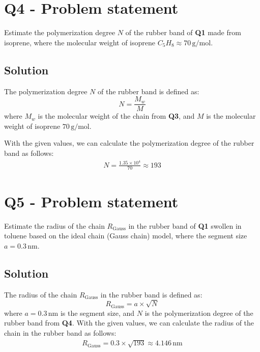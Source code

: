 \documentclass{article}
\begin{document}
\section*{Q4 - Problem statement}
Estimate the polymerization degree $N$ of the rubber band of \textbf{Q1} made from isoprene, where the molecular
weight of isoprene $C_5H_8 \approx 70 \, \mathrm{g/mol}$.
\subsection*{Solution}
The polymerization degree $N$ of the rubber band is defined as:
\begin{equation}
  N = \frac{M_w}{M}
\end{equation}
where $M_w$ is the molecular weight of the chain from \textbf{Q3}, and $M$ is the molecular weight of isoprene $70 \, \mathrm{g/mol}$.

With the given values, we can calculate the polymerization degree of the rubber band as follows:
\begin{equation}
  \begin{gathered}
  N = \frac{1.35 \times 10^4}{70} \approx 193
  \end{gathered}
\end{equation}

\section*{Q5 - Problem statement}
Estimate the radius of the chain \( R_{\text{Gauss}} \) in the rubber band of \textbf{Q1} swollen in toluene based on the ideal chain (Gauss chain) model, where the segment size \( a = 0.3 \, \text{nm} \).
\subsection*{Solution}
The radius of the chain \( R_{\text{Gauss}} \) in the rubber band is defined as:
\begin{equation}
  R_{\text{Gauss}} = a \times \sqrt{N}
\end{equation}
where \( a = 0.3 \, \text{nm} \) is the segment size, and \( N \) is the polymerization degree of the rubber band from \textbf{Q4}.
With the given values, we can calculate the radius of the chain in the rubber band as follows:
\begin{equation}
  \begin{gathered}
  R_{\text{Gauss}} = 0.3 \times \sqrt{193} \approx 4.146 \, \text{nm}
  \end{gathered}
\end{equation}
\newpage
\end{document}
